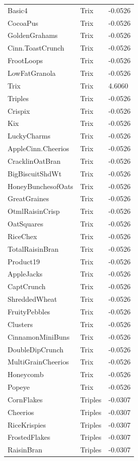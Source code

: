 \begin{table}[!htbp]
\begin{tabular}{lll}
\\
Basic4 & Trix & -0.0526
\\
CocoaPus & Trix & -0.0526
\\
GoldenGrahams & Trix & -0.0526
\\
Cinn.ToastCrunch & Trix & -0.0526
\\
FrootLoops & Trix & -0.0526
\\
LowFatGranola & Trix & -0.0526
\\
Trix & Trix & 4.6060
\\
Triples & Trix & -0.0526
\\
Crispix & Trix & -0.0526
\\
Kix & Trix & -0.0526
\\
LuckyCharms & Trix & -0.0526
\\
AppleCinn.Cheerios & Trix & -0.0526
\\
CracklinOatBran & Trix & -0.0526
\\
BigBiscuitShdWt & Trix & -0.0526
\\
HoneyBunchesofOats & Trix & -0.0526
\\
GreatGraines & Trix & -0.0526
\\
OtmlRaisinCrisp & Trix & -0.0526
\\
OatSquares & Trix & -0.0526
\\
RiceChex & Trix & -0.0526
\\
TotalRaisinBran & Trix & -0.0526
\\
Product19 & Trix & -0.0526
\\
AppleJacks & Trix & -0.0526
\\
CaptCrunch & Trix & -0.0526
\\
ShreddedWheat & Trix & -0.0526
\\
FruityPebbles & Trix & -0.0526
\\
Clusters & Trix & -0.0526
\\
CinnamonMiniBuns & Trix & -0.0526
\\
DoubleDipCrunch & Trix & -0.0526
\\
MultiGrainCheerios & Trix & -0.0526
\\
Honeycomb & Trix & -0.0526
\\
Popeye & Trix & -0.0526
\\
CornFlakes & Triples & -0.0307
\\
Cheerios & Triples & -0.0307
\\
RiceKrispies & Triples & -0.0307
\\
FrostedFlakes & Triples & -0.0307
\\
RaisinBran & Triples & -0.0307

\end{tabular}
\end{table}
